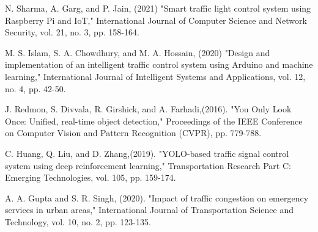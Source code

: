 \documentclass[usenatbib]{tjaa}
\begin{document}
\begin{thebibliography}{99}
N. Sharma, A. Garg, and P. Jain, (2021) "Smart traffic light control system using Raspberry Pi and IoT," International Journal of Computer Science and Network Security, vol. 21, no. 3, pp. 158-164.

M. S. Islam, S. A. Chowdhury, and M. A. Hossain, (2020) "Design and implementation of an intelligent traffic control system using Arduino and machine learning," International Journal of Intelligent Systems and Applications, vol. 12, no. 4, pp. 42-50.

J. Redmon, S. Divvala, R. Girshick, and A. Farhadi,(2016). "You Only Look Once: Unified, real-time object detection," Proceedings of the IEEE Conference on Computer Vision and Pattern Recognition (CVPR), pp. 779-788.

C. Huang, Q. Liu, and D. Zhang,(2019). "YOLO-based traffic signal control system using deep reinforcement learning," Transportation Research Part C: Emerging Technologies, vol. 105, pp. 159-174.

A. A. Gupta and S. R. Singh, (2020). "Impact of traffic congestion on emergency services in urban areas," International Journal of Transportation Science and Technology, vol. 10, no. 2, pp. 123-135.

\end{thebibliography}


\end{document}
